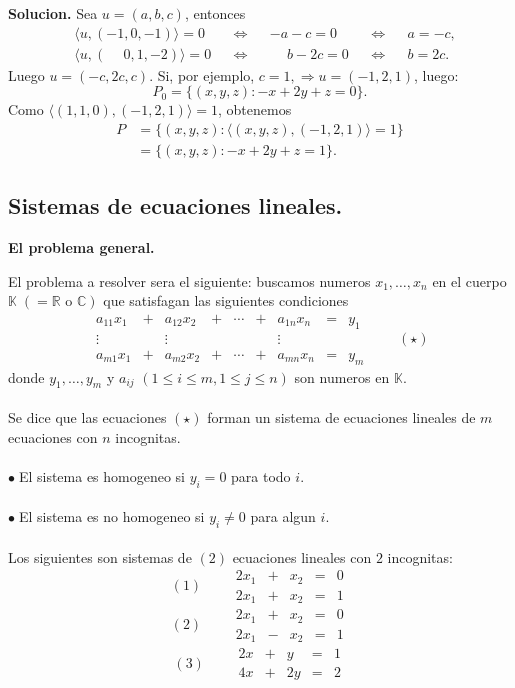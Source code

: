 \documentclass{article}
\theoremstyle{definition}
\theoremstyle{definition}
\theoremstyle{remark}
\newcommand\bl{$\bullet\;$}
\begin{document}
\textbf{Solucion.}
Sea $u=(a,b,c)$, entonces \[
  \begin{aligned}
&\langle u,(-1,0,-1)\rangle = 0 && \Leftrightarrow &&-a-c=0 && \Leftrightarrow && a=-c, \\
&\langle u,(\phantom{-}0,1,-2)\rangle = 0 && \Leftrightarrow && \phantom{-}b-2c=0 && \Leftrightarrow && b=2c.
  \end{aligned}
\]
Luego $u=(-c,2c,c)$. Si, por ejemplo, $c=1, \Rightarrow u=(-1,2,1)$, luego: \[
  P_0=\big\{(x,y,z) : -x+2y + z =0\big\}.
\]
Como $\big\langle (1,1,0),(-1,2,1)\big\rangle=1$, obtenemos \[
  \begin{aligned}
    P&=\big\{(x,y,z) : \big\langle (x,y,z),(-1,2,1)\big\rangle=1\big\}\\
     &=\big\{(x,y,z):-x+2y+z=1\big\}.
  \end{aligned}
\]
\begin{center}
\section{Sistemas de ecuaciones lineales.}
\end{center}
\begin{center}
\textbf{El problema general.}
\end{center}
El problema a resolver sera el siguiente: buscamos numeros $x_1,\dots,x_n$ en el cuerpo $\mathbb{K}\; (= \mathbb{R} \text{ o } \mathbb{C})$ que satisfagan las siguientes condiciones
\[
\begin{matrix}
  a_{11}x_{1} & + & a_{12}x_{2} & + & \cdots & + & a_{1n}x_n & = & y_1 \\ 
  \vdots & & \vdots  & & & & \vdots & & \\
  a_{m1}x_{1} & + & a_{m2}x_2 & + & \cdots & + & a_{mn}x_{n} & = & y_{m}
\end{matrix}\quad \quad (\star)
\]
donde $y_1, \dots, y_m$ y $a_{ij}$ $(1 \leq i \leq m, 1 \leq j \leq n)$ son numeros en $\mathbb{K}$.
\\\\
Se dice que las ecuaciones $(\star)$ forman un sistema de ecuaciones lineales de $m$ ecuaciones con $n$ incognitas.\\\\
\bl El sistema es homogeneo si $y_i=0$ para todo $i$.\\\\
\bl El sistema es no homogeneo si $y_i \neq 0$ para algun $i$.
\\\\
Los siguientes son sistemas de $(2)$ ecuaciones lineales con $2$ incognitas: \[
  (1) \quad \quad \begin{matrix}
    2x_1 & + & x_2 & = & 0 \\
    2x_1 & + & x_2 & = & 1
  \end{matrix}
\]
\[
  (2) \quad \quad \begin{matrix}
    2x_1 & + & x_2 & = & 0 \\
    2x_1 & - & x_2 & = & 1
  \end{matrix}
\]
\[
  (3) \quad \quad \begin{matrix}
    2x & + & y & = & 1 \\
    4x & + & 2y & = & 2
  \end{matrix}
\]
\pagebreak
\end{document}
